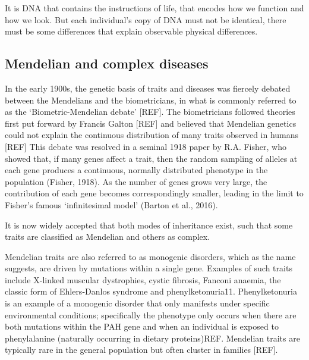 \vspace{4mm}
It is DNA that contains the instructions of life, that encodes how we function and how we look. But each individual’s copy of DNA must not be identical, there must be some differences that explain observable physical differences. 

\subsection{Mendelian and complex diseases} %

In the early 1900s, the genetic basis of traits and diseases was fiercely debated between the Mendelians and the biometricians, in what is commonly referred to as the ‘Biometric-Mendelian debate’ [REF]. The biometricians followed theories first put forward by Francis Galton [REF] and believed that Mendelian genetics could not explain the continuous distribution of many traits observed in humans [REF] 
This debate was resolved in a seminal 1918 paper by R.A. Fisher, who showed that, if many genes affect a trait, then the random sampling of alleles at each gene produces a continuous, normally distributed phenotype in the population (Fisher, 1918). As the number of genes grows very large, the contribution of each gene becomes correspondingly smaller, leading in the limit to Fisher’s famous ‘infinitesimal model’ (Barton et al., 2016).

It is now widely accepted that both modes of inheritance exist, such that some traits are classified as Mendelian and others as complex.

Mendelian traits are also referred to as monogenic disorders, which as the name suggests, are driven by mutations within a single gene. Examples of such traits include X-linked muscular dystrophies, cystic fibrosis, Fanconi anaemia, the classic form of Ehlers-Danlos syndrome and phenylketonuria11. Phenylketonuria is an example of a monogenic disorder that only manifests under specific environmental conditions; specifically the phenotype only occurs when there are both mutations within the PAH gene and when an individual is exposed to phenylalanine (naturally occurring in dietary proteins)REF. Mendelian traits are typically rare in the general population but often cluster in families [REF]. 

